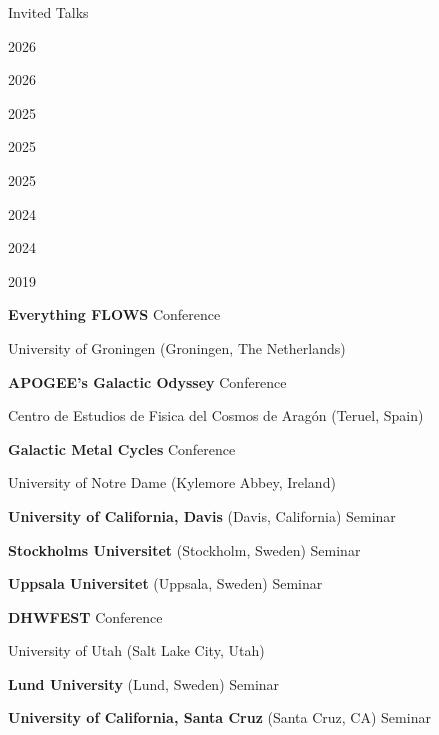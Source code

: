 \documentclass[cv.tex]{subfiles}
\begin{document}
\vspace{4mm}
\noindent
{\color{themecolor} \large Invited Talks}
\par
\vspace{1mm}
\noindent
\parbox{0.18\textwidth}{%
	\vspace{-1mm}
	 \par
	\null \par
	2026 \par
	\null \par
	2026 \par
	\null \par
	2025 \par
	2025 \par
	2025 \par
	2024 \par
	\null \par
	2024 \par
	2019 \par
}
\hspace{1mm}
\parbox{0.8\textwidth}{%
	\textbf{Everything FLOWS} \hfill Conference \par
	University of Groningen (Groningen, The Netherlands) \par
	\textbf{APOGEE's Galactic Odyssey} \hfill Conference \par
	Centro de Estudios de Fisica del Cosmos de Arag{\'o}n (Teruel, Spain) \par
	\textbf{Galactic Metal Cycles} \hfill Conference \par
	University of Notre Dame (Kylemore Abbey, Ireland) \par
	\textbf{University of California, Davis} (Davis, California)
	\hfill Seminar\par
	\textbf{Stockholms Universitet} (Stockholm, Sweden) \hfill Seminar \par
	\textbf{Uppsala Universitet} (Uppsala, Sweden) \hfill Seminar \par
	\textbf{DHWFEST} \hfill Conference \par
	University of Utah (Salt Lake City, Utah) \par
	\textbf{Lund University} (Lund, Sweden) \hfill Seminar \par
	\textbf{University of California, Santa Cruz} (Santa Cruz, CA)
	\hfill Seminar \par
}
\end{document}
